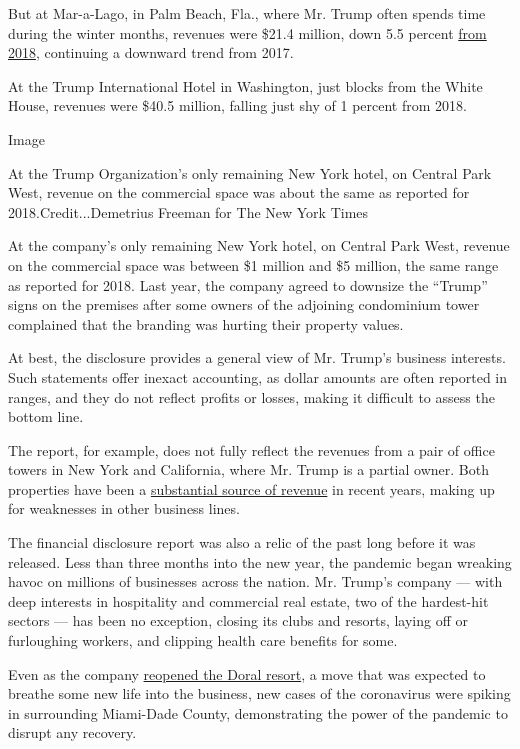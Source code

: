But at Mar-a-Lago, in Palm Beach, Fla., where Mr. Trump often spends
time during the winter months, revenues were \$21.4 million, down 5.5
percent
\href{https://www.nytimes3xbfgragh.onion/2019/05/16/us/politics/trump-financial-disclosures.html}{from
2018}, continuing a downward trend from 2017.

At the Trump International Hotel in Washington, just blocks from the
White House, revenues were \$40.5 million, falling just shy of 1 percent
from 2018.

Image

At the Trump Organization's only remaining New York hotel, on Central
Park West, revenue on the commercial space was about the same as
reported for 2018.Credit...Demetrius Freeman for The New York Times

At the company's only remaining New York hotel, on Central Park West,
revenue on the commercial space was between \$1 million and \$5 million,
the same range as reported for 2018. Last year, the company agreed to
downsize the ``Trump'' signs on the premises after some owners of the
adjoining condominium tower complained that the branding was hurting
their property values.

At best, the disclosure provides a general view of Mr. Trump's business
interests. Such statements offer inexact accounting, as dollar amounts
are often reported in ranges, and they do not reflect profits or losses,
making it difficult to assess the bottom line.

The report, for example, does not fully reflect the revenues from a pair
of office towers in New York and California, where Mr. Trump is a
partial owner. Both properties have been a
\href{https://www.nytimes3xbfgragh.onion/2019/12/25/us/politics/trump-businesses.html}{substantial
source of revenue} in recent years, making up for weaknesses in other
business lines.

The financial disclosure report was also a relic of the past long before
it was released. Less than three months into the new year, the pandemic
began wreaking havoc on millions of businesses across the nation. Mr.
Trump's company --- with deep interests in hospitality and commercial
real estate, two of the hardest-hit sectors --- has been no exception,
closing its clubs and resorts, laying off or furloughing workers, and
clipping health care benefits for some.

Even as the company
\href{https://www.nytimes3xbfgragh.onion/2020/06/23/us/trump-doral-reopen-coronavirus.html}{reopened
the Doral resort}, a move that was expected to breathe some new life
into the business, new cases of the coronavirus were spiking in
surrounding Miami-Dade County, demonstrating the power of the pandemic
to disrupt any recovery.

